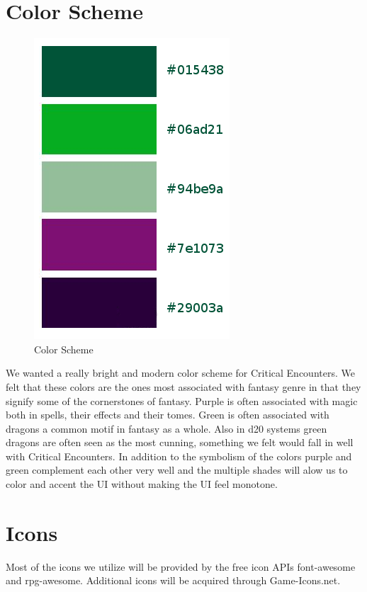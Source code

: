 \documentclass[12pt,a4paper]{report}
\begin{document}
	\newpage
	\section{Color Scheme}
	\begin{figure}[H]
		\centering
		\includegraphics[scale=.5]{colors}
		\caption{Color Scheme}
		\label{fig: Color Scheme}
	\end{figure}
	We wanted a really bright and  modern color scheme for Critical Encounters. We felt that these colors are the ones most associated with fantasy genre in that they signify some of the cornerstones of fantasy. Purple is often associated with magic both in spells, their effects and their tomes. Green is often associated with dragons a common motif in fantasy as a whole. Also in d20 systems green dragons are often seen as the most cunning, something we felt would fall in well with Critical Encounters. In addition to the symbolism of the colors purple and green complement each other very well and the multiple shades will alow us to color and accent the UI without making the UI feel monotone.
	\newpage
	\section{Icons}
	Most of the icons we utilize will be provided by the free icon APIs font-awesome and rpg-awesome. Additional icons will be acquired through Game-Icons.net.
\end{document}
